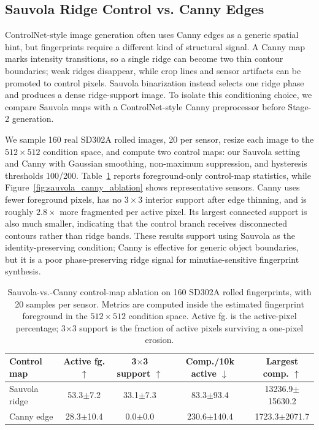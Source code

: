 \documentclass{article}
\begin{document}
\subsection{Sauvola Ridge Control vs. Canny Edges}

ControlNet-style image generation often uses Canny edges as a generic spatial
hint, but fingerprints require a different kind of structural signal.  A Canny
map marks intensity transitions, so a single ridge can become two thin contour
boundaries; weak ridges disappear, while crop lines and sensor artifacts can be
promoted to control pixels.  Sauvola binarization instead selects one ridge
phase and produces a dense ridge-support image.  To isolate this conditioning
choice, we compare Sauvola maps with a ControlNet-style Canny preprocessor
before Stage-2 generation.

We sample 160 real SD302A rolled images, 20 per sensor, resize each image to
the $512 \times 512$ condition space, and compute two control maps: our
Sauvola setting and Canny with Gaussian smoothing, non-maximum suppression,
and hysteresis thresholds 100/200.  Table~\ref{tab:sauvola_canny_ablation}
reports foreground-only control-map statistics, while
Figure~\ref{fig:sauvola_canny_ablation} shows representative sensors.  Canny
uses fewer foreground pixels, has no $3\times3$ interior support after edge
thinning, and is roughly $2.8\times$ more fragmented per active pixel.  Its
largest connected support is also much smaller, indicating that the control
branch receives disconnected contours rather than ridge bands.  These results
support using Sauvola as the identity-preserving condition; Canny is effective
for generic object boundaries, but it is a poor phase-preserving ridge signal
for minutiae-sensitive fingerprint synthesis.

\begin{table}[!htbp]
    \centering
    \footnotesize
    \caption{Sauvola-vs.-Canny control-map ablation on 160 SD302A rolled
    fingerprints, with 20 samples per sensor.  Metrics are computed inside the
    estimated fingerprint foreground in the $512 \times 512$ condition space.
    Active fg. is the active-pixel percentage; 3$\times$3 support is the
    fraction of active pixels surviving a one-pixel erosion.}
    \label{tab:sauvola_canny_ablation}
    \scriptsize
    \setlength{\tabcolsep}{3.2pt}
    \renewcommand{\arraystretch}{0.92}
    \begin{tabular}{lcccc}
        \toprule
        Control map & Active fg. $\uparrow$ & 3$\times$3 support $\uparrow$ & Comp./10k active $\downarrow$ & Largest comp. $\uparrow$ \\
        \midrule
        Sauvola ridge & 53.3$\pm$7.2 & 33.1$\pm$7.3 & 83.3$\pm$93.4 & 13236.9$\pm$15630.2 \\
        Canny edge & 28.3$\pm$10.4 & 0.0$\pm$0.0 & 230.6$\pm$140.4 & 1723.3$\pm$2071.7 \\
        \bottomrule
    \end{tabular}
\end{table}
\end{document}
